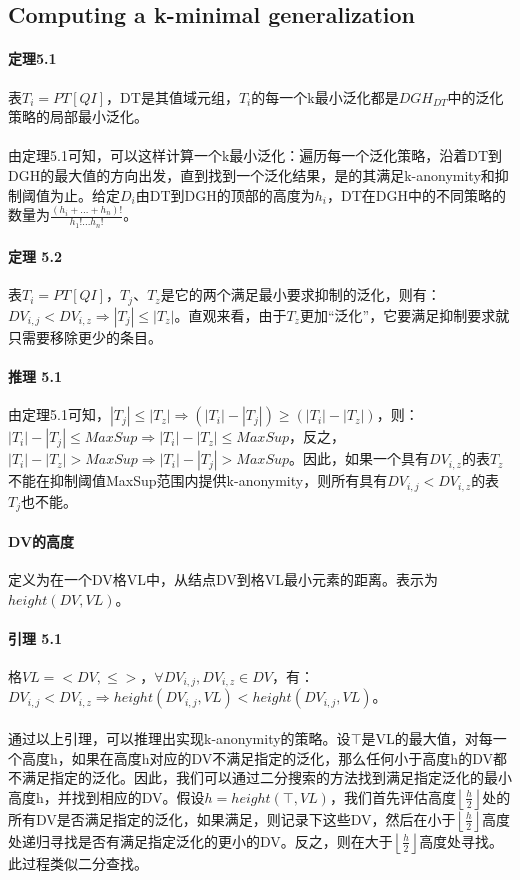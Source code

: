 \documentclass[12pt,a4paper]{article}
\begin{document}
\subsection{Computing a k-minimal generalization}
\paragraph{定理5.1} 表$T_i = PT[QI]$，DT是其值域元组，$T_i$的每一个k最小泛化都是$DGH_{DT}$中的泛化策略的局部最小泛化。
\paragraph{} 由定理5.1可知，可以这样计算一个k最小泛化：遍历每一个泛化策略，沿着DT到DGH的最大值的方向出发，直到找到一个泛化结果，是的其满足k-anonymity和抑制阈值为止。给定$D_i$由DT到DGH的顶部的高度为$h_i$，DT在DGH中的不同策略的数量为$\frac{(h_i+...+h_n)!}{h_1!...h_n!}$。
\paragraph{定理 5.2} 表$T_i = PT[QI]$，$T_j$、$T_z$是它的两个满足最小要求抑制的泛化，则有：$DV_{i,j} < DV_{i,z} \Rightarrow |T_j| \leq |T_z|$。直观来看，由于$T_z$更加“泛化”，它要满足抑制要求就只需要移除更少的条目。
\paragraph{推理 5.1} 由定理5.1可知，$|T_j| \leq |T_z| \Rightarrow (|T_i| - |T_j|) \geq (|T_i| - |T_z|)$，则：$|T_i| - |T_j| \leq MaxSup \Rightarrow |T_i| - |T_z| \leq MaxSup$，反之，$|T_i| - |T_z| > MaxSup \Rightarrow |T_i| - |T_j| > MaxSup$。因此，如果一个具有$DV_{i,z}$的表$T_z$不能在抑制阈值MaxSup范围内提供k-anonymity，则所有具有$DV_{i,j}<DV_{i,z}$的表$T_j$也不能。
\paragraph{DV的高度} 定义为在一个DV格VL中，从结点DV到格VL最小元素的距离。表示为$height(DV,VL)$。
\paragraph{引理 5.1} 格$VL=<DV, \leq >$，$\forall DV_{i,j}, DV_{i,z} \in DV$，有：$DV_{i,j} < DV_{i,z} \Rightarrow height(DV_{i,j},VL) < height(DV_{i,j}, VL)$。

\paragraph{} 通过以上引理，可以推理出实现k-anonymity的策略。设$\top$是VL的最大值，对每一个高度h，如果在高度h对应的DV不满足指定的泛化，那么任何小于高度h的DV都不满足指定的泛化。因此，我们可以通过二分搜索的方法找到满足指定泛化的最小高度h，并找到相应的DV。假设$h=height(\top,VL)$，我们首先评估高度$\left \lfloor \frac{h}{2} \right \rfloor$处的所有DV是否满足指定的泛化，如果满足，则记录下这些DV，然后在小于$\left \lfloor \frac{h}{2} \right \rfloor$高度处递归寻找是否有满足指定泛化的更小的DV。反之，则在大于$\left \lfloor \frac{h}{2} \right \rfloor$高度处寻找。此过程类似二分查找。
\end{document}
